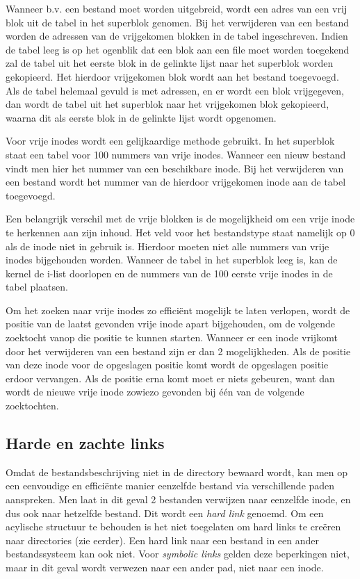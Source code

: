 Wanneer b.v. een bestand moet worden uitgebreid, wordt een adres van een vrij blok uit de tabel in het superblok
genomen. Bij het verwijderen van een bestand worden de adressen van de vrijgekomen blokken in de tabel ingeschreven.
Indien de tabel leeg is op het ogenblik dat een blok aan een file moet worden toegekend zal de tabel uit het eerste
blok in de gelinkte lijst naar het superblok worden gekopieerd. Het hierdoor vrijgekomen blok wordt aan het bestand
toegevoegd. Als de tabel helemaal gevuld is met adressen, en er wordt een blok vrijgegeven, dan wordt de tabel uit
het superblok naar het vrijgekomen blok gekopieerd, waarna dit als eerste blok in de gelinkte lijst wordt opgenomen.

Voor vrije inodes wordt een gelijkaardige methode gebruikt. In het superblok staat een tabel voor 100 nummers van
vrije inodes.  Wanneer een nieuw bestand vindt men hier het nummer van een beschikbare inode. Bij het verwijderen
van een bestand wordt het nummer van de hierdoor vrijgekomen inode aan de tabel toegevoegd.

Een belangrijk verschil met de vrije blokken is de mogelijkheid om een vrije inode te herkennen aan zijn inhoud. Het
veld voor het bestandstype staat namelijk op 0 als de inode niet in gebruik is. Hierdoor moeten niet alle nummers van
vrije inodes bijgehouden worden. Wanneer de tabel in het superblok leeg is, kan de kernel de i-list doorlopen en de
nummers van de 100 eerste vrije inodes in de tabel plaatsen.

Om het zoeken naar vrije inodes zo effici\"ent mogelijk te laten verlopen, wordt de positie van de laatst gevonden
vrije inode apart bijgehouden, om de volgende zoektocht vanop die positie te kunnen starten. Wanneer er een inode
vrijkomt door het verwijderen van een bestand zijn er dan 2 mogelijkheden. Als de positie van deze inode voor de
opgeslagen positie komt wordt de opgeslagen positie erdoor vervangen. Als de positie erna komt moet er niets gebeuren,
want dan wordt de nieuwe vrije inode zowiezo gevonden bij \'e\'en van de volgende zoektochten.

\subsection{Harde en zachte links}

Omdat de bestandsbeschrijving niet in de directory bewaard wordt, kan men op een eenvoudige en effici\"ente
manier eenzelfde bestand via verschillende paden aanspreken. Men laat in dit geval 2 bestanden verwijzen
naar eenzelfde inode, en dus ook naar hetzelfde bestand. Dit wordt een \emph{hard link} genoemd. Om een
acylische structuur te behouden is het niet toegelaten om hard links te cre\"eren naar directories
(zie eerder). Een hard link naar een bestand in een ander bestandssysteem kan ook niet. Voor
\emph{symbolic links} gelden deze beperkingen niet, maar in dit geval wordt verwezen naar een ander pad,
niet naar een inode.

